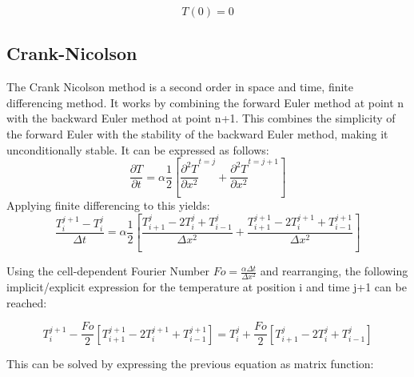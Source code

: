 \documentclass[conf]{new-aiaa}
\begin{document}
\begin{equation}
\label{sample:equation}
  T(0)=0
\end{equation}

\subsection{Crank-Nicolson}
The Crank Nicolson method is a second order in space and time, finite differencing method. It works by combining the forward Euler method at point n with the backward Euler method at point n+1. This combines the simplicity of the forward Euler with the stability of the backward Euler method, making it unconditionally stable. It can be expressed as follows:
\begin{equation}
\label{sample:equation}
\frac{\partial T}{\partial t}=\alpha \frac{1}{2}\left[\frac{\partial^2 T}{\partial x^2}^{t=j}+\frac{\partial^2 T}{\partial x^2}^{t=j+1}\right]
\end{equation}
Applying finite differencing to this yields:
\begin{equation}
\label{sample:equation}
\frac{T_i^{j+1}-T_i^j}{\Delta t}=\alpha \frac{1}{2}\left[\frac{T_{i+1}^j-2T_i^j+T_{i-1}^j}{\Delta x^2}+\frac{T_{i+1}^{j+1}-2T_i^{j+1}+T_{i-1}^{j+1}}{\Delta x^2}\right]
\end{equation}

Using the cell-dependent Fourier Number $Fo=\frac{\alpha \Delta t}{\Delta x^2}$ and rearranging, the following implicit/explicit expression for the temperature at position i and time j+1 can be reached:

\begin{equation}
\label{sample:equation}
  T_i^{j+1}-\frac{Fo}{2}\left[T_{i+1}^{j+1}-2T_i^{j+1}+T_{i-1}^{j+1}\right]=T_i^j+\frac{Fo}{2}\left[T_{i+1}^j-2T_i^j+T_{i-1}^j\right]
\end{equation}

This can be solved by expressing the previous equation as matrix function:
\end{document}
